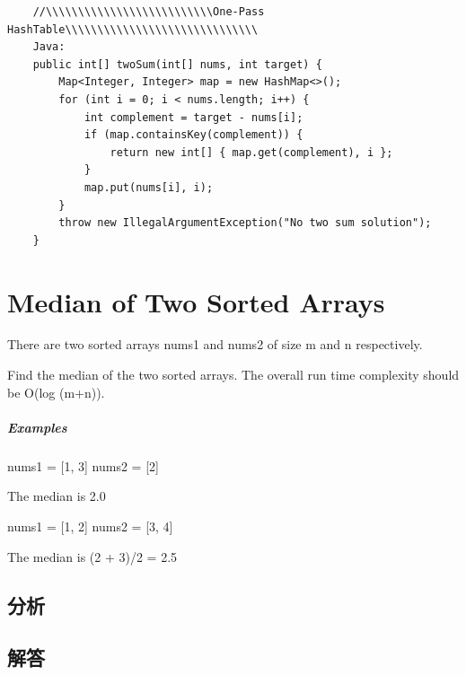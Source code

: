 \documentclass[UTF8,a4paper,12pt]{ctexbook}
\begin{document}
\begin{lstlisting}
	//\\\\\\\\\\\\\\\\\\\\\\\\\\One-Pass HashTable\\\\\\\\\\\\\\\\\\\\\\\\\\\\\\
	Java:
	public int[] twoSum(int[] nums, int target) {
		Map<Integer, Integer> map = new HashMap<>();
		for (int i = 0; i < nums.length; i++) {
			int complement = target - nums[i];
			if (map.containsKey(complement)) {
				return new int[] { map.get(complement), i };
			}
			map.put(nums[i], i);
		}
		throw new IllegalArgumentException("No two sum solution");
	}
	\end{lstlisting}
\section{Median of Two Sorted Arrays}
		There are two sorted arrays nums1 and nums2 of size m and n respectively.
		
		Find the median of the two sorted arrays. The overall run time complexity should be O(log (m+n)).
	\subparagraph{Examples}
		nums1 = [1, 3]
		nums2 = [2]
		
		The median is 2.0
		
		nums1 = [1, 2]
		nums2 = [3, 4]
		
		The median is (2 + 3)/2 = 2.5
	\subsection{分析}
	
	\subsection{解答}
	
\end{document}
